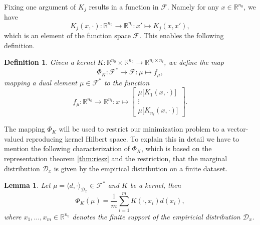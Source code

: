 \documentclass[11pt, a4paper]{article}
\newtheorem{lemma}[theorem]{Lemma}
\newtheorem{definition}[theorem]{Definition}
\newcommand{\R}{\mathbb{R}}
\newcommand{\D}{\mathcal{D}}
\newcommand{\F}{\mathcal{F}}
\begin{document}
Fixing one argument of $K_j$ results in a function in $\F$. Namely for any $x \in \R^{n_0}$, we have
\[ K_j(x,\cdot) : \R^{n_0} \to \R^{n_l} : x' \mapsto K_j(x,x'), \]
which is an element of the function space $\F$. This enables the following definition.

\begin{definition} \label{def:phi}
Given a kernel $K: \R^{n_0} \times \R^{n_0} \to \R^{n_l \times n_l}$, we define the map
\[ \Phi_K : \F^* \to \F : \mu \mapsto f_{\mu}, \]
mapping a dual element $\mu \in \F^*$ to the function
\[ f_{\mu} : \R^{n_0} \to \R^{n_l} : x \mapsto  \begin{bmatrix} \mu \big [K_1(x,\cdot) \big ] \\ \vdots \\ \mu \big [ K_{n_l}(x,\cdot) \big ] \end{bmatrix}. \]
\end{definition}

The mapping $\Phi_K$ will be used to restrict our minimization problem to a vector-valued reproducing kernel Hilbert space. To explain this in detail we have to mention the following characterization of $\Phi_K$, which is based on the representation theorem \ref{thm:riesz} and the restriction, that the marginal distribution $\D_x$ is given by the empirical distribution on a finite dataset.

\begin{lemma} \label{lem:phi}
Let $\mu = \langle d, \cdot \rangle_{\D_x} \in \F^*$ and $K$ be a kernel, then
\[ \Phi_K(\mu) = \frac{1}{m}\sum_{i=1}^{m} K(\cdot,x_i)d(x_i), \]
where $x_1, \dots, x_m \in \R^{n_0}$ denotes the finite support of the empiricial distribution $\D_x$.
\end{lemma}
\end{document}

